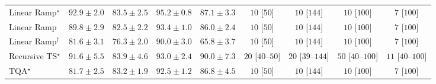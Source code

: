 \begin{tabular}{l|cccc|cccc|}
Linear Ramp$^\star$ & {\cellcolor[HTML]{760C71}} \color[HTML]{F1F1F1} $92.9\pm 2.0$ & {\cellcolor[HTML]{8A54A6}} \color[HTML]{F1F1F1} $83.5\pm 2.5$ & {\cellcolor[HTML]{61065D}} \color[HTML]{F1F1F1} $95.2\pm 0.8$ & {\cellcolor[HTML]{873897}} \color[HTML]{F1F1F1} $87.1\pm 3.3$ & {\cellcolor[HTML]{FFF6F2}} \color[HTML]{000000} $10$ [$50$] & {\cellcolor[HTML]{FFF6F2}} \color[HTML]{000000} $10$ [$144$] & {\cellcolor[HTML]{FFF6F2}} \color[HTML]{000000} $10$ [$100$] & {\cellcolor[HTML]{FFF6F2}} \color[HTML]{000000} $7$ [$100$] \\
Linear Ramp & {\cellcolor[HTML]{832088}} \color[HTML]{F1F1F1} $89.8\pm 2.9$ & {\cellcolor[HTML]{8B5CAA}} \color[HTML]{F1F1F1} $82.5\pm 2.2$ & {\cellcolor[HTML]{710A6D}} \color[HTML]{F1F1F1} $93.4\pm 1.0$ & {\cellcolor[HTML]{88419D}} \color[HTML]{F1F1F1} $86.0\pm 2.4$ & {\cellcolor[HTML]{FFF6F2}} \color[HTML]{000000} $10$ [$50$] & {\cellcolor[HTML]{FFF6F2}} \color[HTML]{000000} $10$ [$144$] & {\cellcolor[HTML]{FFF6F2}} \color[HTML]{000000} $10$ [$100$] & {\cellcolor[HTML]{FFF6F2}} \color[HTML]{000000} $7$ [$100$] \\
Linear Ramp$^\dagger$ & {\cellcolor[HTML]{8B62AD}} \color[HTML]{F1F1F1} $81.6\pm 3.1$ & {\cellcolor[HTML]{8C8BC0}} \color[HTML]{F1F1F1} $76.3\pm 2.0$ & {\cellcolor[HTML]{831F86}} \color[HTML]{F1F1F1} $90.0\pm 3.0$ & {\cellcolor[HTML]{B2CAE1}} \color[HTML]{000000} $65.8\pm 3.7$ & {\cellcolor[HTML]{FFF6F2}} \color[HTML]{000000} $10$ [$50$] & {\cellcolor[HTML]{FFF6F2}} \color[HTML]{000000} $10$ [$144$] & {\cellcolor[HTML]{FFF6F2}} \color[HTML]{000000} $10$ [$100$] & {\cellcolor[HTML]{FFF6F2}} \color[HTML]{000000} $7$ [$100$] \\
Recursive TS$^\star$ & {\cellcolor[HTML]{810F7C}} \color[HTML]{F1F1F1} $91.6\pm 5.5$ & {\cellcolor[HTML]{8A51A5}} \color[HTML]{F1F1F1} $83.9\pm 4.6$ & {\cellcolor[HTML]{740B70}} \color[HTML]{F1F1F1} $93.0\pm 2.4$ & {\cellcolor[HTML]{831F86}} \color[HTML]{F1F1F1} $90.0\pm 7.3$ & {\cellcolor[HTML]{FFF3EF}} \color[HTML]{000000} $20$ [$40$--$50$] & {\cellcolor[HTML]{FFF3EF}} \color[HTML]{000000} $20$ [$39$--$144$] & {\cellcolor[HTML]{FEEBE8}} \color[HTML]{000000} $50$ [$40$--$100$] & {\cellcolor[HTML]{FFF5F1}} \color[HTML]{000000} $11$ [$40$--$100$] \\
TQA$^\star$ & {\cellcolor[HTML]{8B62AD}} \color[HTML]{F1F1F1} $81.7\pm 2.5$ & {\cellcolor[HTML]{8A56A7}} \color[HTML]{F1F1F1} $83.2\pm 1.9$ & {\cellcolor[HTML]{790D75}} \color[HTML]{F1F1F1} $92.5\pm 1.2$ & {\cellcolor[HTML]{873B99}} \color[HTML]{F1F1F1} $86.8\pm 4.5$ & {\cellcolor[HTML]{FFF6F2}} \color[HTML]{000000} $10$ [$50$] & {\cellcolor[HTML]{FFF6F2}} \color[HTML]{000000} $10$ [$144$] & {\cellcolor[HTML]{FFF6F2}} \color[HTML]{000000} $10$ [$100$] & {\cellcolor[HTML]{FFF6F2}} \color[HTML]{000000} $7$ [$100$] \\

\end{tabular}
